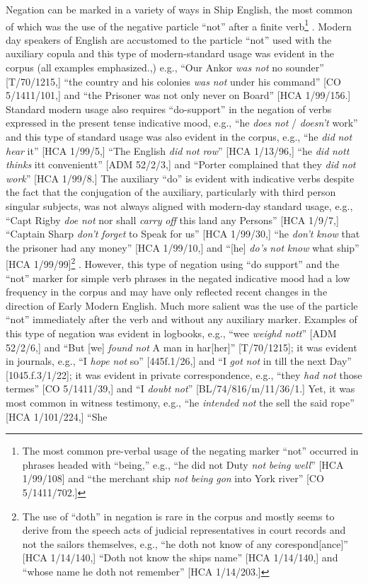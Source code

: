   Negation can be marked in a variety of ways in Ship English, the most common of which was the use of the negative particle “not” after a finite verb\footnote{The most common pre-verbal usage of the negating marker “not” occurred in phrases headed with “being,” e.g., “he did not Duty \textit{not} \textit{being} \textit{well}” [HCA 1/99/108] and “the merchant ship \textit{not} \textit{being} \textit{gon} into York river” [CO 5/1411/702.]} . Modern day speakers of English are accustomed to the particle “not” used with the auxiliary copula and this type of modern-standard usage was evident in the corpus (all examples emphasized.,) e.g., “Our Ankor \textit{was} \textit{not} no sounder” [T/70/1215,] “the country and his colonies \textit{was} \textit{not} under his command” [CO 5/1411/101,] and “the Prisoner was not only never on Board” [HCA 1/99/156.] Standard modern usage also requires “do-support” in the negation of verbs expressed in the present tense indicative mood, e.g., “he \textit{does} \textit{not} / \textit{doesn’t} work” and this type of standard usage was also evident in the corpus, e.g., “he \textit{did} \textit{not} \textit{hear} it” [HCA 1/99/5,] “The English \textit{did} \textit{not} \textit{row}” [HCA 1/13/96,] “he \textit{did} \textit{nott} \textit{thinks} itt convenientt” [ADM 52/2/3,] and “Porter complained that they \textit{did} \textit{not} \textit{work}” [HCA 1/99/8.] The auxiliary “do” is evident with indicative verbs despite the fact that the conjugation of the auxiliary, particularly with third person singular subjects, was not always aligned with modern-day standard usage, e.g., “Capt Rigby \textit{doe} \textit{not} nor shall \textit{carry} \textit{off} this land any Persons” [HCA 1/9/7,] “Captain Sharp \textit{don’t} \textit{forget} to Speak for us” [HCA 1/99/30,] “he \textit{don’t} \textit{know} that the prisoner had any money” [HCA 1/99/10,] and “[he] \textit{do’s} \textit{not} \textit{know} what ship” [HCA 1/99/99]\footnote{The use of “doth” in negation is rare in the corpus and mostly seems to derive from the speech acts of judicial representatives in court records and not the sailors themselves, e.g., “he doth not know of any corespond[ance]” [HCA 1/14/140,] “Doth not know the ships name” [HCA 1/14/140,] and “whose name he doth not remember” [HCA 1/14/203.]} . However, this type of negation using “do support” and the “not” marker for simple verb phrases in the negated indicative mood had a low frequency in the corpus and may have only reflected recent changes in the direction of Early Modern English. Much more salient was the use of the particle “not” immediately after the verb and without any auxiliary marker. Examples of this type of negation was evident in logbooks, e.g., “wee \textit{weighd} \textit{nott}” [ADM 52/2/6,] and “But [we] \textit{found} \textit{not} A man in har[her]” [T/70/1215]; it was evident in journals, e.g., “I \textit{hope} \textit{not} so” [445f.1/26,] and “I \textit{got} \textit{not} in till the next Day” [1045.f.3/1/22]; it was evident in private correspondence, e.g., “they \textit{had} \textit{not} those termes” [CO 5/1411/39,] and “I \textit{doubt} \textit{not}” [BL/74/816/m/11/36/1.] Yet, it was most common in witness testimony, e.g., “he \textit{intended} \textit{not} the sell the said rope” [HCA 1/101/224,] “She 